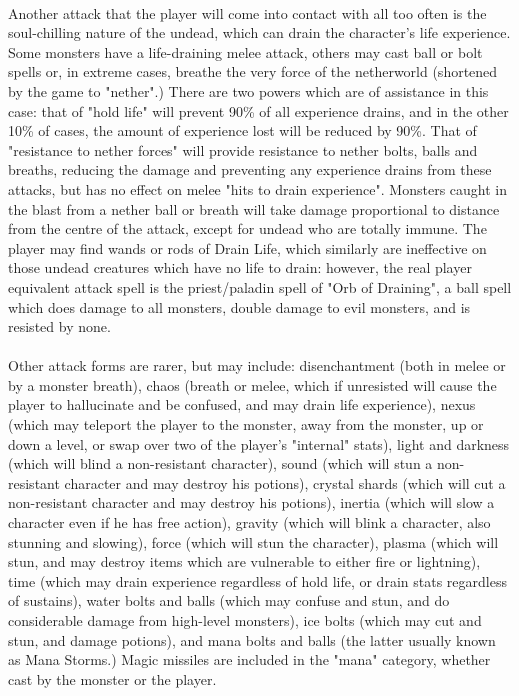 \paragraph{}
Another attack that the player will come into contact with all too often
is the soul-chilling nature of the undead, which can drain the character's
life experience. Some monsters have a life-draining melee attack, others may
cast ball or bolt spells or, in extreme cases, breathe the very force of the
netherworld (shortened by the game to "nether".) There are two powers which
are of assistance in this case: that of "hold life" will prevent 90\% of all
experience drains, and in the other 10\% of cases, the amount of experience
lost will be reduced by 90\%. That of "resistance to nether forces" will
provide resistance to nether bolts, balls and breaths, reducing the damage
and preventing any experience drains from these attacks, but has no effect
on melee "hits to drain experience". Monsters caught in the blast from a
nether ball or breath will take damage proportional to distance from the
centre of the attack, except for undead who are totally immune. The player
may find wands or rods of Drain Life, which similarly are ineffective on
those undead creatures which have no life to drain: however, the real
player equivalent attack spell is the priest/paladin spell of "Orb of
Draining", a ball spell which does damage to all monsters, double damage to
evil monsters, and is resisted by none.

\paragraph{}
Other attack forms are rarer, but may include: disenchantment (both in melee
or by a monster breath), chaos (breath or melee, which if unresisted
will cause the player to hallucinate and be confused, and may drain life
experience), nexus (which may teleport the player to the monster, away from
the monster, up or down a level, or swap over two of the player's "internal"
stats), light and darkness (which will blind a non-resistant character),
sound (which will stun a non-resistant character and may destroy his
potions), crystal shards (which will cut a non-resistant character and may
destroy his potions), inertia (which will slow a character even if he has
free action), gravity (which will blink a character, also stunning and
slowing), force (which will stun the character), plasma (which will stun,
and may destroy items which are vulnerable to either fire or lightning),
time (which may drain experience regardless of hold life, or drain stats
regardless of sustains), water bolts and balls (which may confuse and
stun, and do considerable damage from high-level monsters), ice bolts
(which may cut and stun, and damage potions), and mana bolts and balls
(the latter usually known as Mana Storms.) Magic missiles are included in
the "mana" category, whether cast by the monster or the player.


